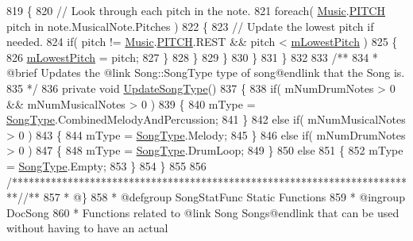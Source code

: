 \begin{DoxyCodeInclude}
819             \{
820                 \textcolor{comment}{// Look through each pitch in the note.}
821                 \textcolor{keywordflow}{foreach}( \hyperlink{class_music}{Music}.\hyperlink{group___music_enums_ga508f69b199ea518f935486c990edac1d}{PITCH} pitch in note.MusicalNote.Pitches )
822                 \{
823                     \textcolor{comment}{// Update the lowest pitch if needed.}
824                     \textcolor{keywordflow}{if}( pitch != \hyperlink{class_music}{Music}.\hyperlink{group___music_enums_ga508f69b199ea518f935486c990edac1d}{PITCH}.REST && pitch < 
      \hyperlink{group___song_priv_var_ga293976ef4c2050687a81edfbf77b4fc1}{mLowestPitch} )
825                     \{
826                         \hyperlink{group___song_priv_var_ga293976ef4c2050687a81edfbf77b4fc1}{mLowestPitch} = pitch;
827                     \}
828                 \}
829             \}
830         \}
831     \}
832 \textcolor{comment}{}
833 \textcolor{comment}{    /**}
834 \textcolor{comment}{     * @brief Updates the @link Song::SongType type of song@endlink that the Song is.}
835 \textcolor{comment}{    */}
836     \textcolor{keyword}{private} \textcolor{keywordtype}{void} \hyperlink{group___song_priv_func_ga9a1d6eba1576c3631d3c0331196d9ae2}{UpdateSongType}()
837     \{
838         \textcolor{keywordflow}{if}( mNumDrumNotes > 0 && mNumMusicalNotes > 0 )
839         \{
840             mType = \hyperlink{group___song_enums_gae681a1f001333e39fc1cb4fea97bfe1b}{SongType}.CombinedMelodyAndPercussion;
841         \}
842         \textcolor{keywordflow}{else} \textcolor{keywordflow}{if}( mNumMusicalNotes > 0 )
843         \{
844             mType = \hyperlink{group___song_enums_gae681a1f001333e39fc1cb4fea97bfe1b}{SongType}.Melody;
845         \}
846         \textcolor{keywordflow}{else} \textcolor{keywordflow}{if}( mNumDrumNotes > 0 )
847         \{
848             mType = \hyperlink{group___song_enums_gae681a1f001333e39fc1cb4fea97bfe1b}{SongType}.DrumLoop;
849         \}
850         \textcolor{keywordflow}{else}
851         \{
852             mType = \hyperlink{group___song_enums_gae681a1f001333e39fc1cb4fea97bfe1b}{SongType}.Empty;
853         \}
854     \}
855 
856     \textcolor{comment}{/*************************************************************************/}\textcolor{comment}{/** }
857 \textcolor{comment}{     * @\}}
858 \textcolor{comment}{     * @defgroup SongStatFunc Static Functions}
859 \textcolor{comment}{     * @ingroup DocSong}
860 \textcolor{comment}{     * Functions related to @link Song Songs@endlink that can be used without having to have an actual
}
\end{DoxyCodeInclude}
